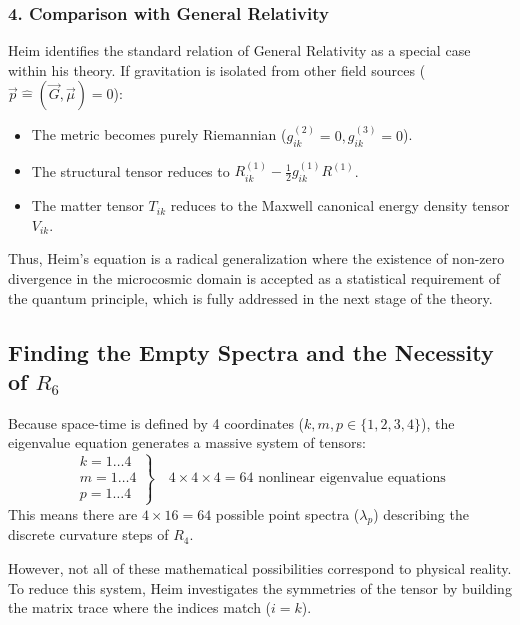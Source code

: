 \documentclass[11pt,a4paper,oneside]{article}
\begin{document}
\subsubsection*{4. Comparison with General Relativity}
Heim identifies the standard relation of General Relativity as a special case within his theory. If gravitation is isolated from other field sources ($\vec{p} \hat{=} (\vec{G}, \vec{\mu}) = 0$):
\begin{itemize}
    \item The metric becomes purely Riemannian ($g_{ik}^{(2)} = 0, g_{ik}^{(3)} = 0$).
    \item The structural tensor reduces to $R_{ik}^{(1)} - \frac{1}{2}g_{ik}^{(1)} R^{(1)}$.
    \item The matter tensor $T_{ik}$ reduces to the Maxwell canonical energy density tensor $V_{ik}$.
\end{itemize}
Thus, Heim's equation is a radical generalization where the existence of non-zero divergence in the microcosmic domain is accepted as a statistical requirement of the quantum principle, which is fully addressed in the next stage of the theory. 

\subsection{Finding the Empty Spectra and the Necessity of \texorpdfstring{$R_6$}{R6}}

Because space-time is defined by 4 coordinates ($k, m, p \in \{1,2,3,4\}$), the eigenvalue equation generates a massive system of tensors:
\begin{equation}
    \left. \begin{matrix} k=1\dots 4 \\ m=1\dots 4 \\ p=1\dots 4 \end{matrix} \right\} \quad 4 \times 4 \times 4 = 64 \text{ nonlinear eigenvalue equations}
\end{equation}
This means there are $4 \times 16 = 64$ possible point spectra ($\lambda_p$) describing the discrete curvature steps of $R_4$.

However, not all of these mathematical possibilities correspond to physical reality. To reduce this system, Heim investigates the symmetries of the tensor by building the matrix trace where the indices match ($i=k$).
\end{document}

